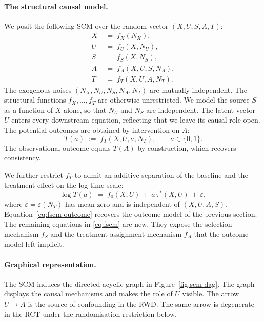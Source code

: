 \paragraph{The structural causal model.}
We posit the following SCM over the random vector $(X, U, S, A, T)$:
\begin{equation}
\begin{aligned}
X &\;=\; f_X(N_X),\\
U &\;=\; f_U(X, N_U),\\
S &\;=\; f_S(X, N_S),\\
A &\;=\; f_A(X, U, S, N_A),\\
T &\;=\; f_T(X, U, A, N_T).
\end{aligned}
\label{eq:fscm}
\end{equation}
The exogenous noises $(N_X, N_U, N_S, N_A, N_T)$ are mutually independent.
The structural functions $f_X, \ldots, f_T$ are otherwise unrestricted.
We model the source $S$ as a function of $X$ alone, so that $N_U$ and $N_S$ are independent.
The latent vector $U$ enters every downstream equation, reflecting that we leave its causal role open.
The potential outcomes are obtained by intervention on $A$:
\begin{equation}
T(a) \;:=\; f_T(X, U, a, N_T), \qquad a \in \{0, 1\}.
\label{eq:fscm-po}
\end{equation}
The observational outcome equals $T(A)$ by construction, which recovers consistency.

We further restrict $f_T$ to admit an additive separation of the baseline and the treatment effect on the log-time scale:
\begin{equation}
\log T(a) \;=\; f_0(X, U) \,+\, a\,\tau^*(X, U) \,+\, \varepsilon,
\label{eq:fscm-outcome}
\end{equation}
where $\varepsilon = \varepsilon(N_T)$ has mean zero and is independent of $(X, U, A, S)$.
Equation~\eqref{eq:fscm-outcome} recovers the outcome model of the previous section.
The remaining equations in \eqref{eq:fscm} are new.
They expose the selection mechanism $f_S$ and the treatment-assignment mechanism $f_A$ that the outcome model left implicit.

\paragraph{Graphical representation.}
The SCM induces the directed acyclic graph in Figure~\ref{fig:scm-dag}.
The graph displays the causal mechanisms and makes the role of $U$ visible.
The arrow $U \to A$ is the source of confounding in the RWD.
The same arrow is degenerate in the RCT under the randomisation restriction below.

